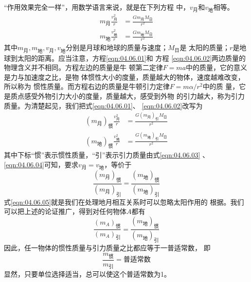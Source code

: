 “作用效果完全一样”，用数学语言来说，就是在下列方程
中，$ v_\text{月} $和$v_\text{地}$相等。
\begin{align}
  m _ { \text{月} } \frac { v _ { \text{月} } ^ { 2 } } { r } & = \frac { G m _ { \text{月} } M _ { \text{日} } } { r ^ { 2 } } \label{eqn:04.06.01} \\
  m _ { \text{地} } \frac { v _ { \text{地} } ^ { 2 } } { r } & = \frac { G m _ { \text{地} } M _ { \text{日} } } { r ^ { 2 } } \label{eqn:04.06.02}
\end{align}
其中$ m _ { \text{月} } , m _ { \text{地} } , v _ { \text{月} } , v _ { \text{地} } $分别是月球和地球的质量与速度；$ M _ { \text{日} } $是
太阳的质量；$ r $是地球到太阳的距离。应当注意，方程\eqref{eqn:04.06.01}和
方程 \eqref{eqn:04.06.02}两边质量的物理含义并不相同。方程左边的质量是牛
顿第二定律$ F = m a $中的质量，它的意义是力与加速度之比，是物
体惯性大小的度量，质量越大的物体，速度越难改变，所以称为
惯性质量。而方程右边的质量是牛顿引力定律$ F = m \alpha / r ^ { 2 } $中的质
量，它是质点感受外物引力大小的度量，质量越大，感受到外物
的引力越大，称为引力质量。为清楚起见，我们把式\eqref{eqn:04.06.01}、
\eqref{eqn:04.06.02}改写为
\begin{align}
  \left(m _ { \text{月} }\right) _ {\text{惯}}
  \frac { v _ { \text{月} } ^ 2 } { r } & = \frac { G \left(m _ { \text{月} }\right) _ {\text{引}} M _ { \text{日} } } { r ^ { 2 } }\label{eqn:04.06.03} \\
  \left(m _ { \text{地} }\right) _ {\text{惯}}
  \frac { v _ { \text{地} } ^ 2 } { r } & = \frac { G \left(m _ { \text{地} }\right) _ {\text{引}} M _ { \text{日} } } { r ^ { 2 } }\label{eqn:04.06.04}
\end{align}
其中下标“惯”表示惯性质量，“引”表示引力质量由式\eqref{eqn:04.06.03}
、\eqref{eqn:04.06.04}可知，要求$ v _ { \text{月}}=v _ { \text{地} } $，等价于
\begin{equation}\label{eqn:04.06.05}
  \frac { \left(m _ { \text{月} }\right) _ {\text{惯}} } { \left(m _ { \text{月} }\right) _ {\text{引}} } = \frac { \left(m _ { \text{地} }\right) _ {\text{惯}} } { \left(m _ { \text{地} }\right) _ {\text{引}} }
\end{equation}
式\eqref{eqn:04.06.05}就是我们在处理地月相互关系时可以忽略太阳作用的
根据。我们可以把上述的论证推广，得到对任何物体$ A $都有
\begin{equation}\label{eqn:04.06.06}
  \frac { \left(m _ { A }\right) _ {\text{惯}} } { \left(m _ { A }\right) _ {\text{引}} } = \frac { \left(m _ { \text{地} }\right) _ {\text{惯}} } { \left(m _ { \text{地} }\right) _ {\text{引}} }
\end{equation}
因此，任一物体的惯性质量与引力质量之比都应等于一普适常数，
即
\begin{equation}\label{eqn:04.06.07}
  \frac { m _ {\text{惯}} } { m _ {\text{引}} } = \text{普适常数}
\end{equation}
显然，只要单位选择适当，总可以使这个普适常数为1。

